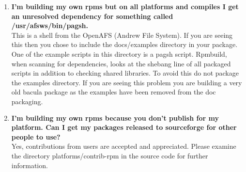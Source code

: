 \begin{enumerate}
\footnotesize
\begin{verbatim}
        chmod -R 777 /usr/src/redhat
        chmod -R 777 /usr/src/RPM
        chmod -R 777 /usr/src/packages
        
\end{verbatim}
\normalsize

If you are working on a shared system where you can not use the method
above then you need to recreate the appropriate above directory tree with all
of its subdirectories inside your home directory.  Then create a file named

{\tt .rpmmacros} 

in your home directory (or edit  the file if it already exists)
and add the following line:  

\footnotesize
\begin{verbatim}
        %_topdir /home/myuser/redhat
        %_tmppath /tmp
        
\end{verbatim}
\normalsize

Another handy directive for the .rpmmacros file if you wish to suppress the
creation of debug rpm packages is:

\footnotesize
\begin{verbatim}
        %debug_package %{nil}
        
\end{verbatim}

\normalsize

\item 
   \label{faq5}
   {\bf I'm building my own rpms but on all platforms and compiles I get an
   unresolved dependency for something called /usr/afsws/bin/pagsh.} \\
   This is a shell from the OpenAFS (Andrew File System).  If you are
   seeing this then you chose to include the docs/examples directory in
   your package.  One of the example scripts in this directory is a pagsh
   script.  Rpmbuild, when scanning for dependencies, looks at the shebang
   line of all packaged scripts in addition to checking shared libraries.
   To avoid this do not package the examples directory.  If you are seeing
   this problem you are building a very old bacula package as the examples
   have been removed from the doc packaging.

\item 
   \label{faq6}
   {\bf I'm building my own rpms because you don't publish for my platform.
    Can I get my packages released to sourceforge for other people to use?}
    \\
    Yes, contributions from users are accepted and appreciated.  Please
    examine the directory platforms/contrib-rpm in the source code for
    further information.


\end{enumerate}
